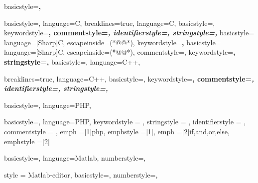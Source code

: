 \captionsetup[lstlisting]{format=listing,labelfont=white,textfont=white,font= scriptsize}


	{
	basicstyle=\scriptsize\bf\ttfamily,
	}
   
	{
	basicstyle=\scriptsize,
	language=C,
	}
	{
  	breaklines=true,
  	language=C,
  	basicstyle=\scriptsize,
  	keywordstyle=\bfseries\color{green!40!black},
  	commentstyle=\itshape\color{purple!40!black},
  	identifierstyle=\color{blue},
  	stringstyle=\color{orange},
    }
	{
	basicstyle=\scriptsize
	language=[Sharp]C,
	escapeinside={(*@}{@*)},
	keywordstyle=\bfseries,
	}
	{
	basicstyle=\scriptsize
	language=[Sharp]C,
	escapeinside={(*@}{@*)},
	commentstyle=\color{greencomments},
	keywordstyle=\color{bluekeywords}\bfseries,
	stringstyle=\color{redstrings},
	}
	{
	basicstyle=\scriptsize,
	language=C++,
 	}
 	
	{
  	breaklines=true,
  	language=C++,
  	basicstyle=\scriptsize,
  	keywordstyle=\bfseries\color{green!40!black},
  	commentstyle=\itshape\color{purple!40!black},
  	identifierstyle=\color{blue},
  	stringstyle=\color{orange},
    }
    
	{
	basicstyle=\scriptsize,
	language=PHP,
	}
	
	{
	basicstyle=\scriptsize,
	language=PHP,
	keywordstyle    = \color{dkblue},
  	stringstyle     = \color{red},
  	identifierstyle = \color{dkgreen},
  	commentstyle    = \color{gray},
  	emph            =[1]{php},
  	emphstyle       =[1]\color{black},
  	emph            =[2]{if,and,or,else},
  	emphstyle       =[2]\color{dkyellow}
  }
  
	{
	basicstyle=\scriptsize,
	language=Matlab,
	numberstyle=\tiny\ttfamily\color{gray75},
	}
	
	{
	style = Matlab-editor,
	basicstyle=\scriptsize,
	numberstyle=\tiny\ttfamily\color{gray75},
	}
	
